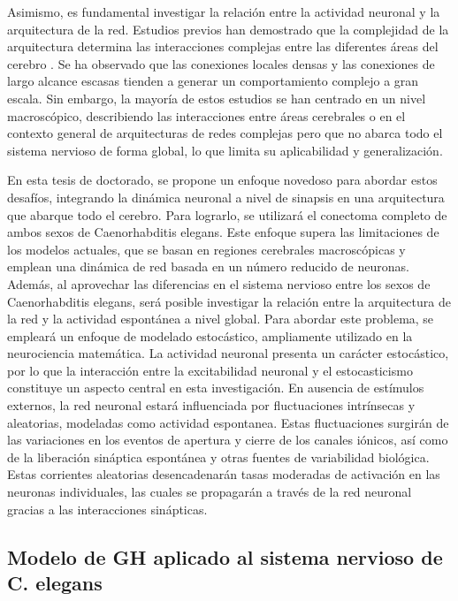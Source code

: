 Asimismo, es fundamental investigar la relación entre la actividad neuronal y la arquitectura de la red. Estudios previos han demostrado que la complejidad de la arquitectura determina las interacciones complejas entre las diferentes áreas del cerebro \cite{galan_how_2008}. Se ha observado que las conexiones locales densas y las conexiones de largo alcance escasas tienden a generar un comportamiento complejo a gran escala. Sin embargo, la mayoría de estos estudios se han centrado en un nivel macroscópico, describiendo las interacciones entre áreas cerebrales o en el contexto general de arquitecturas de redes complejas pero que no abarca todo el sistema nervioso de forma global, lo que limita su aplicabilidad y generalización.


En esta tesis de doctorado, se propone un enfoque novedoso para abordar estos desafíos, integrando la dinámica neuronal a nivel de sinapsis en una arquitectura que abarque todo el cerebro. Para lograrlo, se utilizará el conectoma completo de ambos sexos de Caenorhabditis elegans. Este enfoque supera las limitaciones de los modelos actuales, que se basan en regiones cerebrales macroscópicas y emplean una dinámica de red basada en un número reducido de neuronas. Además, al aprovechar las diferencias en el sistema nervioso entre los sexos de Caenorhabditis elegans, será posible investigar la relación entre la arquitectura de la red y la actividad espontánea a nivel global.  Para abordar este problema, se empleará un enfoque de modelado estocástico, ampliamente utilizado en la neurociencia matemática. La actividad neuronal presenta un carácter estocástico, por lo que la interacción entre la excitabilidad neuronal y el estocasticismo constituye un aspecto central en esta investigación. En ausencia de estímulos externos, la red neuronal estará influenciada por fluctuaciones intrínsecas y aleatorias, modeladas como actividad espontanea. Estas fluctuaciones surgirán de las variaciones en los eventos de apertura y cierre de los canales iónicos, así como de la liberación sináptica espontánea y otras fuentes de variabilidad biológica. Estas corrientes aleatorias desencadenarán tasas moderadas de activación en las neuronas individuales, las cuales se propagarán a través de la red neuronal gracias a las interacciones sinápticas.





\subsection{Modelo de GH aplicado al sistema nervioso  de C. elegans }\label{sec:modelocritico}


